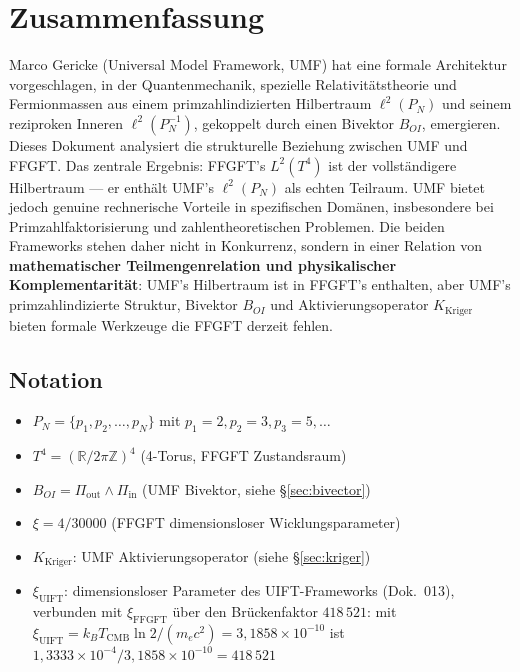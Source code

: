 
\section*{Zusammenfassung}

Marco Gericke (Universal Model Framework, UMF) hat eine formale Architektur
vorgeschlagen, in der Quantenmechanik, spezielle Relativitätstheorie und
Fermionmassen aus einem primzahlindizierten Hilbertraum $\ell^2(P_N)$ und
seinem reziproken Inneren $\ell^2(P_N^{-1})$, gekoppelt durch einen Bivektor
$B_{OI}$, emergieren. Dieses Dokument analysiert die strukturelle Beziehung
zwischen UMF und FFGFT. Das zentrale Ergebnis: FFGFT's $L^2(T^4)$ ist der
vollständigere Hilbertraum — er enthält UMF's $\ell^2(P_N)$ als echten
Teilraum. UMF bietet jedoch genuine rechnerische Vorteile in spezifischen
Domänen, insbesondere bei Primzahlfaktorisierung und zahlentheoretischen
Problemen. Die beiden Frameworks stehen daher nicht in Konkurrenz, sondern in einer Relation von \textbf{mathematischer Teilmengenrelation und physikalischer Komplementarität}: UMF's Hilbertraum ist in FFGFT's enthalten, aber UMF's primzahlindizierte Struktur, Bivektor $B_{OI}$ und Aktivierungsoperator $K_\text{Kriger}$ bieten formale Werkzeuge die FFGFT derzeit fehlen.

\subsection*{Notation}

\begin{itemize}
  \item $P_N = \{p_1, p_2, \dots, p_N\}$ mit $p_1=2, p_2=3, p_3=5, \dots$
  \item $T^4 = (\mathbb{R}/2\pi\mathbb{Z})^4$ (4-Torus, FFGFT Zustandsraum)
  \item $B_{OI} = \Pi_\text{out} \wedge \Pi_\text{in}$ (UMF Bivektor, siehe \S\ref{sec:bivector})
  \item $\xi = 4/30000$ (FFGFT dimensionsloser Wicklungsparameter)
  \item $K_\text{Kriger}$: UMF Aktivierungsoperator (siehe \S\ref{sec:kriger})
  \item $\xi_\text{UIFT}$: dimensionsloser Parameter des UIFT-Frameworks (Dok.~013), verbunden mit $\xi_\text{FFGFT}$ über den Brückenfaktor $418\,521$: mit $\xi_\text{UIFT} = k_BT_\text{CMB}\ln2/(m_ec^2) = 3{,}1858\times10^{-10}$ ist $1{,}3333\times10^{-4}/3{,}1858\times10^{-10} = 418\,521$
\end{itemize}

